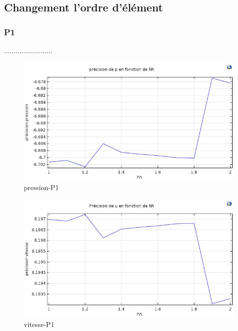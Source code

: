 \documentclass[a4paper,11pt]{report} %
\begin{document}
\subsection{Changement l'ordre d'élément}

\subsubsection{P1}.........................
\begin{figure}[!h]
\centering
\hspace*{0mm}\vfill
\begin{center} \includegraphics[width=1.\textwidth]{pression_P1.jpg} \end{center}
\vfill\hspace*{0mm}
\caption{pression-P1 }
\label{v_ponctuel}
\end{figure}\pagebreak

\begin{figure}[!h]
\centering
\hspace*{0mm}\vfill
\begin{center} \includegraphics[width=1.\textwidth]{vitesse_u_P1.jpg} \end{center}
\vfill\hspace*{0mm}
\caption{vitesse-P1 }
\label{v_ponctuel}
\end{figure}\pagebreak
\end{document}
